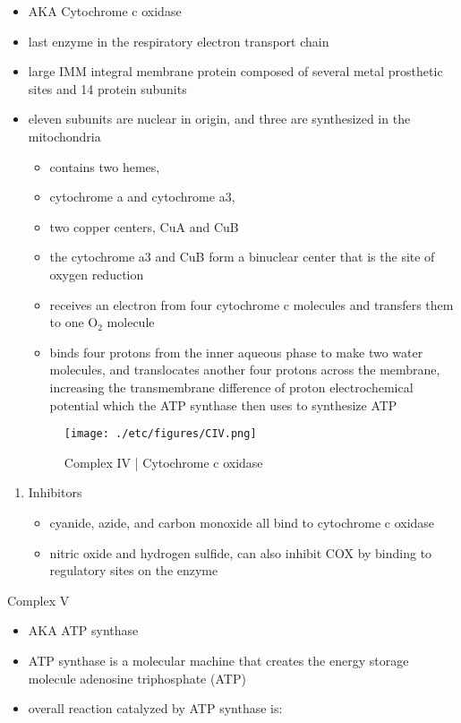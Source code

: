 \documentclass{scrartcl}
\begin{document}
\begin{itemize}
\item AKA Cytochrome c oxidase
\item last enzyme in the respiratory electron transport chain
\item large IMM integral membrane protein composed of several metal prosthetic sites and 14 protein subunits
\item eleven subunits are nuclear in origin, and three are synthesized in the mitochondria
\begin{itemize}
\item contains two hemes,
\item cytochrome a and cytochrome a3,
\item two copper centers, CuA and CuB
\item the cytochrome a3 and CuB form a binuclear center that is the site of oxygen reduction
\item receives an electron from four cytochrome c molecules and
transfers them to one O\(_{\text{2}}\) molecule
\end{itemize}

{\small{}}

\begin{itemize}
\item binds four protons from the inner aqueous phase to make two water
molecules, and translocates another four protons across the
membrane, increasing the transmembrane difference of proton
electrochemical potential which the ATP synthase then uses to
synthesize ATP
\end{itemize}

\begin{figure}[htbp]
\centering
\texttt{[image: ./etc/figures/CIV.png]}
\caption[cIV]{\label{fig:org3b16c0e}
Complex IV | Cytochrome c oxidase}
\end{figure}
\end{itemize}

\begin{enumerate}
\item Inhibitors
\label{sec:orgfaa59fc}
\begin{itemize}
\item cyanide, azide, and carbon monoxide all bind to cytochrome c
oxidase
\item nitric oxide and hydrogen sulfide, can also inhibit COX by
binding to regulatory sites on the enzyme
\end{itemize}
\end{enumerate}
\item Complex V
\label{sec:orga662c64}
\begin{itemize}
\item AKA ATP synthase

\item ATP synthase is a molecular machine that creates the energy storage
molecule adenosine triphosphate (ATP)
\item overall reaction catalyzed by ATP synthase is:
\end{itemize}
\end{document}
